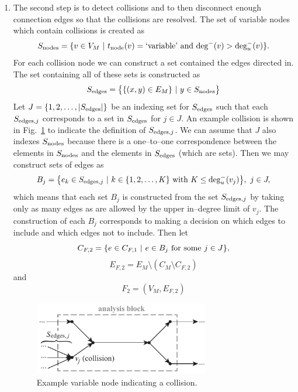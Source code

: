 \begin{enumerate}
	\item The second step is to detect collisions and to then disconnect enough connection edges so that the collisions are resolved. The set of variable nodes which contain collisions is created as
	\begin{equation}
	S_\textrm{nodes} = \{v \in V_M \ | \  t_\textrm{node}(v) = \textrm{`variable'} \textrm{ and } \textrm{deg}^-(v) > \textrm{deg}_u^-(v) \}.
	\end{equation}
	For each collision node we can construct a set contained the edges directed in. The set containing all of these sets is constructed as
	\begin{equation}
	S_\textrm{edges} = \big \{ \{(x,y) \in E_M\} \ | \  y \in S_\textrm{nodes} \big \}
	\end{equation}
	Let $J=\{1,2,\ldots,|S_\textrm{edges}|\}$ be an indexing set for $S_\textrm{edges}$ such that each $S_{\textrm{edges},j}$ corresponds to a set in $S_\textrm{edges}$ for $j \in J$. 
	An example collision is shown in Fig.~\ref{f:collision} to indicate the definition of $S_{\textrm{edges},j}$. 
	We can assume that $J$ also indexes $S_\textrm{nodes}$ because there is a one--to--one correspondence between the elements in $S_\textrm{nodes}$ and the elements in $S_\textrm{edges}$ (which are sets). 
	Then we may construct sets of edges as
	\begin{equation}
	B_j = \big \{e_k \in S_{\textrm{edges},j} \ | \  k \in \{1,2,\ldots,K\} \textrm{ with } K \leq \textrm{deg}_u^-(v_j) \big \}, \ j \in J,
	\end{equation}
	which means that each set $B_j$ is constructed from the set $S_{\textrm{edges},j}$ by taking only as many edges as are allowed by the upper in--degree limit of $v_j$. The construction of each $B_j$ corresponds to making a decision on which edges to include and which edges not to include. Then let
	\begin{equation}
	C_{F,2} = \{ e \in C_{F,1} \ | \  e \in B_j \textrm{ for some } j \in J\},
	\end{equation}
	\begin{equation}
	E_{F,2} = E_M \setminus (C_M \setminus C_{F,2})
	\end{equation}
	and
	\begin{equation}
	F_2 = (V_M,E_{F,2})
	\end{equation}
	\begin{figure}[htb!]
		\begin{center}
		\includegraphics[width=3in]{images/analysis_block_collision}
		\end{center}
		\vspace{-20pt}
	\caption{Example variable node indicating a collision.}
	\label{f:collision}
	\end{figure}


\end{enumerate}
